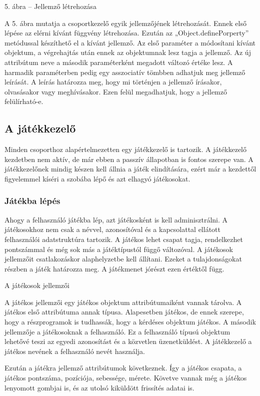 \documentclass[]{article}
\begin{document}
5. ábra -- Jellemző létrehozása

A 5. ábra mutatja a csoportkezelő egyik jellemzőjének létrehozását.
Ennek első lépése az elérni kívánt függvény létrehozása. Ezután az
„Object.definePorperty'' metódussal készíthető el a kívánt jellemző. Az
első paraméter a módosítani kívánt objektum, a végrehajtás után ennek az
objektumnak lesz tagja a jellemző. Az új attribútum neve a második
paraméterként megadott változó értéke lesz. A harmadik paraméterben
pedig egy asszociatív tömbben adhatjuk meg jellemző leírását. A leírás
határozza meg, hogy mi történjen a jellemző írásakor, olvasásakor vagy
meghívásakor. Ezen felül megadhatjuk, hogy a jellemző felülírható-e.


\subsection{A játékkezelő}

Minden csoporthoz alapértelmezetten egy játékkezelő is tartozik. A
játékkezelő kezdetben nem aktív, de már ebben a passzív állapotban is
fontos szerepe van. A játékkezelőnek mindig készen kell állnia a játék
elindítására, ezért már a kezdettől figyelemmel kíséri a szobába lépő és
azt elhagyó játékosokat.


\subsubsection{Játékba lépés}

Ahogy a felhasználó játékba lép, azt játékosként is kell adminisztrálni.
A játékosokhoz nem csak a névvel, azonosítóval és a kapcsolattal
ellátott felhasználói adatstruktúra tartozik. A játékos lehet csapat
tagja, rendelkezhet pontszámmal és még sok más a játéktípustól függő
változóval. A játékosok jellemzőit csatlakozáskor alaphelyzetbe kell
állítani. Ezeket a tulajdonságokat részben a játék határozza meg. A
játékmenet jórészt ezen értéktől függ.

A játékosok jellemzői

A játékos jellemzői egy játékos objektum attribútumaiként vannak
tárolva. A játékos első attribútuma annak típusa. Alapesetben játékos,
de ennek szerepe, hogy a részprogramok is tudhassák, hogy a kérdéses
objektum játékos. A második jellemzője a játékosoknak a felhasználó. Ez
a felhasználó típusú objektum lehetővé teszi az egyedi azonosítást és a
közvetlen üzenetküldést. A játékkezelő a játékos nevének a felhasználó
nevét használja.

Ezután a játékra jellemző attribútumok következnek. Így a játékos
csapata, a játékos pontszáma, pozíciója, sebessége, mérete. Követve
vannak még a játékos lenyomott gombjai is, és az utolsó kiküldött
frissítés adatai is.
\end{document}
